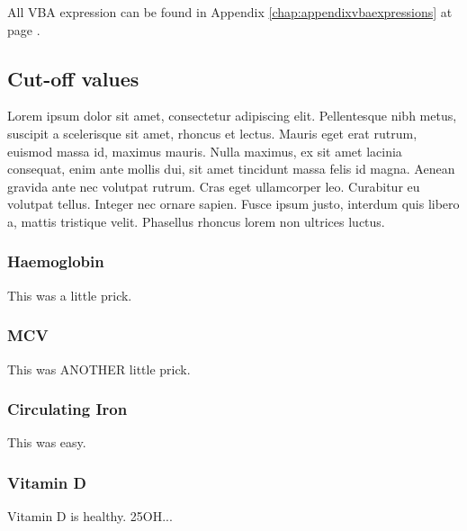All VBA expression can be found in Appendix \ref{chap:appendixvbaexpressions} at page \pageref{chap:appendixvbaexpressions}.


\subsection{Cut-off values}\label{sub:cutoffvalues}
Lorem ipsum dolor sit amet, consectetur adipiscing elit. Pellentesque nibh metus, suscipit a scelerisque sit amet, rhoncus et lectus. Mauris eget erat rutrum, euismod massa id, maximus mauris. Nulla maximus, ex sit amet lacinia consequat, enim ante mollis dui, sit amet tincidunt massa felis id magna. Aenean gravida ante nec volutpat rutrum. Cras eget ullamcorper leo. Curabitur eu volutpat tellus. Integer nec ornare sapien. Fusce ipsum justo, interdum quis libero a, mattis tristique velit. Phasellus rhoncus lorem non ultrices luctus.


\subsubsection{Haemoglobin}\label{sub:haemoglobin}
This was a little prick. 


\subsubsection{MCV}\label{sub:mcv}
This was ANOTHER little prick. 


\subsubsection{Circulating Iron}\label{sub:iron}
This was easy.


\subsubsection{Vitamin D}\label{sub:vitaminD}
Vitamin D is healthy. 25OH...


